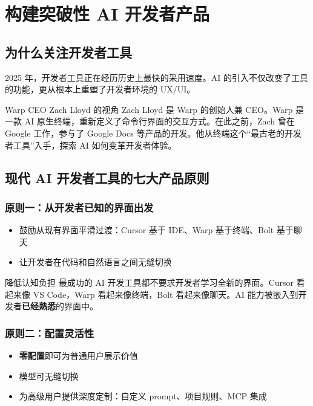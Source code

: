 \section{构建突破性 AI 开发者产品}

\subsection{为什么关注开发者工具}

2025 年，开发者工具正在经历历史上最快的采用速度。AI 的引入不仅改变了工具的功能，更从根本上重塑了开发者环境的 UX/UI。

\begin{knowledgebox}{Warp CEO Zach Lloyd 的视角}
Zach Lloyd 是 Warp 的创始人兼 CEO。Warp 是一款 AI 原生终端，重新定义了命令行界面的交互方式。在此之前，Zach 曾在 Google 工作，参与了 Google Docs 等产品的开发。他从终端这个``最古老的开发者工具''入手，探索 AI 如何变革开发者体验。
\end{knowledgebox}

\subsection{现代 AI 开发者工具的七大产品原则}

\subsubsection{原则一：从开发者已知的界面出发}

\begin{itemize}
    \item 鼓励从现有界面平滑过渡：Cursor 基于 IDE、Warp 基于终端、Bolt 基于聊天
    \item 让开发者在代码和自然语言之间无缝切换
\end{itemize}

\begin{importantbox}{降低认知负担}
最成功的 AI 开发工具都不要求开发者学习全新的界面。Cursor 看起来像 VS Code，Warp 看起来像终端，Bolt 看起来像聊天。AI 能力被嵌入到开发者\textbf{已经熟悉}的界面中。
\end{importantbox}

\subsubsection{原则二：配置灵活性}

\begin{itemize}
    \item \textbf{零配置}即可为普通用户展示价值
    \item 模型可无缝切换
    \item 为高级用户提供深度定制：自定义 prompt、项目规则、MCP 集成
\end{itemize}

